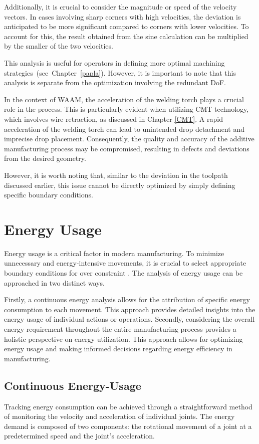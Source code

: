 Additionally, it is crucial to consider the magnitude or speed of the velocity vectors. In cases involving sharp corners with high velocities, the deviation is anticipated to be more significant compared to corners with lower velocities. To account for this, the result obtained from the sine calculation can be multiplied by the smaller of the two velocities.

This analysis is useful for operators in defining more optimal machining strategies~(see~Chapter~\ref{papla}). However, it is important to note that this analysis is separate from the optimization involving the redundant DoF.

In the context of WAAM, the acceleration of the welding torch plays a crucial role in the process. This is particularly evident when utilizing CMT technology, which involves wire retraction, as discussed in Chapter \ref{CMT}. A rapid acceleration of the welding torch can lead to unintended drop detachment and imprecise drop placement. Consequently, the quality and accuracy of the additive manufacturing process may be compromised, resulting in defects and deviations from the desired geometry.

However, it is worth noting that, similar to the deviation in the toolpath discussed earlier, this issue cannot be directly optimized by simply defining specific boundary conditions.

\section{Energy Usage}
Energy usage is a critical factor in modern manufacturing. To minimize unnecessary and energy-intensive movements, it is crucial to select appropriate boundary conditions for over constraint . The analysis of energy usage can be approached in two distinct ways.

Firstly, a continuous energy analysis allows for the attribution of specific energy consumption to each movement. This approach provides detailed insights into the energy usage of individual actions or operations. Secondly, considering the overall energy requirement throughout the entire manufacturing process provides a holistic perspective on energy utilization. This approach allows for optimizing energy usage and making informed decisions regarding energy efficiency in manufacturing.

\subsection{Continuous Energy-Usage}
Tracking energy consumption can be achieved through a straightforward method of monitoring the velocity and acceleration of individual joints. The energy demand is composed of two components: the rotational movement of a joint at a predetermined speed and the joint's acceleration.

